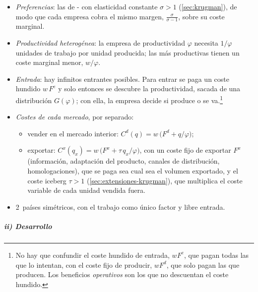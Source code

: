 \documentclass[11pt]{article}
\begin{document}
\begin{itemize}
\item \emph{Preferencias}: las de - con elasticidad constante $\sigma>1$ (\ref{sec:krugman}), de modo que cada empresa cobra el mismo margen, $\frac{\sigma}{\sigma-1}$, sobre su coste marginal.
\item \emph{Productividad heterogénea}: la empresa de productividad $\varphi$ necesita $1/\varphi$ unidades de trabajo por unidad producida; las más productivas tienen un coste marginal menor, $w/\varphi$.
\item \emph{Entrada}: hay infinitos entrantes posibles. Para entrar se paga un coste hundido $w\,F^e$ y solo entonces se descubre la productividad, sacada de una distribución $G(\varphi)$; con ella, la empresa decide si produce o se va.\footnote{No hay que confundir el coste hundido de entrada, $wF^e$, que pagan todas las que lo intentan, con el coste fijo de producir, $wF^d$, que solo pagan las que producen. Los beneficios \emph{operativos} son los que no descuentan el coste hundido.}
\item \emph{Costes de cada mercado}, por separado:
  \begin{itemize}
  \item vender en el mercado interior: $C^d(q)=w\,\big(F^d+q/\varphi\big)$;
  \item exportar: $C^x(q_x)=w\,\big(F^x+\tau\,q_x/\varphi\big)$, con un coste fijo de exportar $F^x$ (información, adaptación del producto, canales de distribución, homologaciones), que se paga sea cual sea el volumen exportado, y el coste iceberg $\tau>1$ (\ref{sec:extensiones-krugman}), que multiplica el coste variable de cada unidad vendida fuera.
  \end{itemize}
\item 2~países simétricos, con el trabajo como único factor y libre entrada.
\end{itemize}

\subparagraph{ii) Desarrollo}
\end{document}
